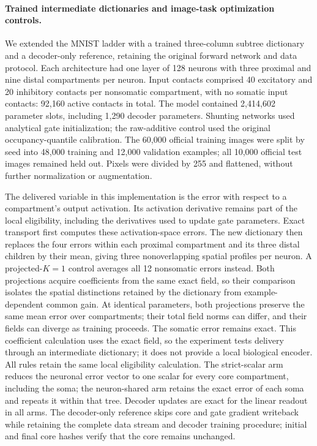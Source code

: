 \paragraph{Trained intermediate dictionaries and image-task optimization controls.}
We extended the MNIST ladder with a trained three-column subtree dictionary and a decoder-only reference, retaining the original forward network and data protocol. Each architecture had one layer of 128 neurons with three proximal and nine distal compartments per neuron. Input contacts comprised 40 excitatory and 20 inhibitory contacts per nonsomatic compartment, with no somatic input contacts: 92,160 active contacts in total. The model contained 2,414,602 parameter slots, including 1,290 decoder parameters. Shunting networks used analytical gate initialization; the raw-additive control used the original occupancy-quantile calibration. The 60,000 official training images were split by seed into 48,000 training and 12,000 validation examples; all 10,000 official test images remained held out. Pixels were divided by 255 and flattened, without further normalization or augmentation.

The delivered variable in this implementation is the error with respect to a compartment's output activation. Its activation derivative remains part of the local eligibility, including the derivatives used to update gate parameters. Exact transport first computes these activation-space errors. The new dictionary then replaces the four errors within each proximal compartment and its three distal children by their mean, giving three nonoverlapping spatial profiles per neuron. A projected-$K=1$ control averages all 12 nonsomatic errors instead. Both projections acquire coefficients from the same exact field, so their comparison isolates the spatial distinctions retained by the dictionary from example-dependent common gain. At identical parameters, both projections preserve the same mean error over compartments; their total field norms can differ, and their fields can diverge as training proceeds. The somatic error remains exact. This coefficient calculation uses the exact field, so the experiment tests delivery through an intermediate dictionary; it does not provide a local biological encoder. All rules retain the same local eligibility calculation. The strict-scalar arm reduces the neuronal error vector to one scalar for every core compartment, including the soma; the neuron-shared arm retains the exact error of each soma and repeats it within that tree. Decoder updates are exact for the linear readout in all arms. The decoder-only reference skips core and gate gradient writeback while retaining the complete data stream and decoder training procedure; initial and final core hashes verify that the core remains unchanged.


